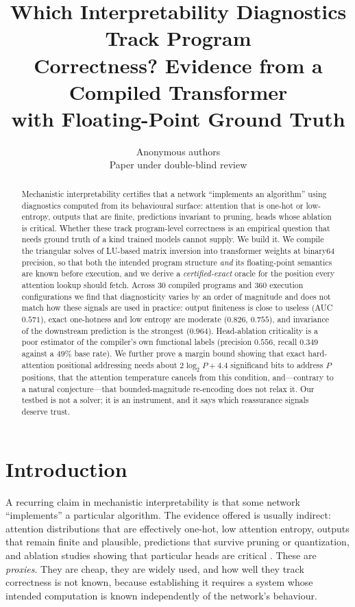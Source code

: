\documentclass{article}
\title{Which Interpretability Diagnostics Track Program\\
Correctness? Evidence from a Compiled Transformer\\
with Floating-Point Ground Truth}
\author{Anonymous authors\\Paper under double-blind review}
\theoremstyle{definition}
\begin{document}
\maketitle

\begin{abstract}
Mechanistic interpretability certifies that a network ``implements an algorithm''
using diagnostics computed from its behavioural surface: attention that is
one-hot or low-entropy, outputs that are finite, predictions invariant to
pruning, heads whose ablation is critical. Whether these track program-level
correctness is an empirical question that needs ground truth of a kind trained
models cannot supply. We build it. We compile the triangular solves of LU-based
matrix inversion into transformer weights at binary64 precision, so that both
the intended program structure \emph{and} its floating-point semantics are known
before execution, and we derive a \emph{certified-exact} oracle for the position
every attention lookup should fetch. Across 30 compiled programs and 360
execution configurations we find that diagnosticity varies by an order of
magnitude and does not match how these signals are used in practice: output
finiteness is close to useless (AUC $0.571$), exact one-hotness and low entropy
are moderate ($0.826$, $0.755$), and invariance of the downstream prediction is
the strongest ($0.964$). Head-ablation criticality is a poor estimator of the
compiler's own functional labels (precision $0.556$, recall $0.349$ against a
$49\%$ base rate). We further prove a margin bound showing that exact
hard-attention positional addressing needs about $2\log_2 P + 4.4$ significand
bits to address $P$ positions, that the attention temperature cancels from this
condition, and---contrary to a natural conjecture---that bounded-magnitude
re-encoding does not relax it. Our testbed is not a solver; it is an instrument,
and it says which reassurance signals deserve trust.
\end{abstract}

\section{Introduction}

A recurring claim in mechanistic interpretability is that some network
``implements'' a particular algorithm. The evidence offered is usually indirect:
attention distributions that are effectively one-hot, low attention entropy,
outputs that remain finite and plausible, predictions that survive pruning or
quantization, and ablation studies showing that particular heads are critical
\citep{clark2019bert,voita2019analyzing,elhage2021framework,wang2023ioi}. These
are \emph{proxies}. They are cheap, they are widely used, and how well they track
correctness is not known, because establishing it requires a system whose
intended computation is known independently of the network's behaviour.
\end{document}
